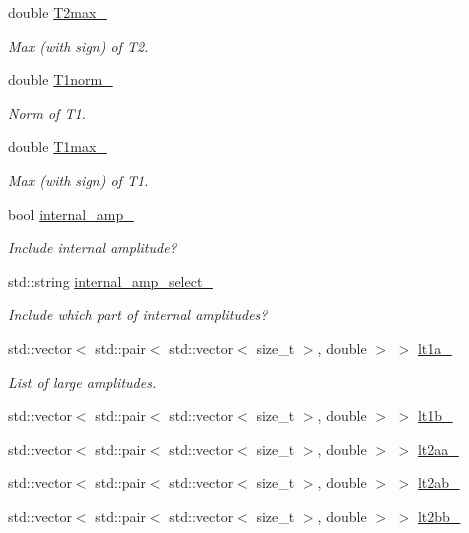 \begin{DoxyCompactItemize}
double \mbox{\hyperlink{classforte_1_1_d_s_r_g___m_r_p_t2_ab39306f8bc090fc3ae56f603f5530529}{T2max\+\_\+}}
\begin{DoxyCompactList}\small\item\em Max (with sign) of T2. \end{DoxyCompactList}\item 
double \mbox{\hyperlink{classforte_1_1_d_s_r_g___m_r_p_t2_acb527bb20caef27ed8beb32a91009fe7}{T1norm\+\_\+}}
\begin{DoxyCompactList}\small\item\em Norm of T1. \end{DoxyCompactList}\item 
double \mbox{\hyperlink{classforte_1_1_d_s_r_g___m_r_p_t2_abca106ff840059c6fec9e2ead9c8012d}{T1max\+\_\+}}
\begin{DoxyCompactList}\small\item\em Max (with sign) of T1. \end{DoxyCompactList}\item 
bool \mbox{\hyperlink{classforte_1_1_d_s_r_g___m_r_p_t2_a401c2c0dfe6379fc40b962605c42ad41}{internal\+\_\+amp\+\_\+}}
\begin{DoxyCompactList}\small\item\em Include internal amplitude? \end{DoxyCompactList}\item 
std\+::string \mbox{\hyperlink{classforte_1_1_d_s_r_g___m_r_p_t2_a292cb8e86dd56fb34402abf0c1aae2be}{internal\+\_\+amp\+\_\+select\+\_\+}}
\begin{DoxyCompactList}\small\item\em Include which part of internal amplitudes? \end{DoxyCompactList}\item 
std\+::vector$<$ std\+::pair$<$ std\+::vector$<$ size\+\_\+t $>$, double $>$ $>$ \mbox{\hyperlink{classforte_1_1_d_s_r_g___m_r_p_t2_a6e27bcceffda696f2fd2e72dd7845e1e}{lt1a\+\_\+}}
\begin{DoxyCompactList}\small\item\em List of large amplitudes. \end{DoxyCompactList}\item 
std\+::vector$<$ std\+::pair$<$ std\+::vector$<$ size\+\_\+t $>$, double $>$ $>$ \mbox{\hyperlink{classforte_1_1_d_s_r_g___m_r_p_t2_a8b029902475ae1a4db6263508053145c}{lt1b\+\_\+}}
\item 
std\+::vector$<$ std\+::pair$<$ std\+::vector$<$ size\+\_\+t $>$, double $>$ $>$ \mbox{\hyperlink{classforte_1_1_d_s_r_g___m_r_p_t2_a1f532da34bc467fdd83b918981a592ae}{lt2aa\+\_\+}}
\item 
std\+::vector$<$ std\+::pair$<$ std\+::vector$<$ size\+\_\+t $>$, double $>$ $>$ \mbox{\hyperlink{classforte_1_1_d_s_r_g___m_r_p_t2_a4cff2fc3a4b602efb9d4310b026f0b71}{lt2ab\+\_\+}}
\item 
std\+::vector$<$ std\+::pair$<$ std\+::vector$<$ size\+\_\+t $>$, double $>$ $>$ \mbox{\hyperlink{classforte_1_1_d_s_r_g___m_r_p_t2_afd4a5fef0331eb55d9469c705af6e1d7}{lt2bb\+\_\+}}
\end{DoxyCompactItemize}


